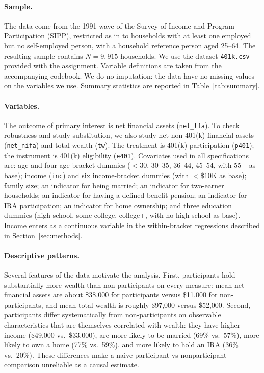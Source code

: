 \documentclass[11pt]{article}
\begin{document}
\paragraph{Sample.}
The data come from the 1991 wave of the Survey of Income and Program
Participation (SIPP), restricted as in \cite{ch2004} to households with at
least one employed but no self-employed person, with a household reference
person aged 25--64.  The resulting sample contains
$N = 9{,}915$ households.  We use the dataset \texttt{401k.csv} provided
with the assignment.  Variable definitions are taken from the accompanying
codebook.  We do no imputation: the data have no missing values on the
variables we use.  Summary statistics are reported in Table~\ref{tab:summary}.

\paragraph{Variables.}
The outcome of primary interest is net financial assets (\texttt{net\_tfa}).
To check robustness and study substitution, we also study net non-401(k)
financial assets (\texttt{net\_nifa}) and total wealth (\texttt{tw}).  The
treatment is 401(k) participation (\texttt{p401}); the instrument is 401(k)
eligibility (\texttt{e401}).  Covariates used in all specifications are: age
and four age-bracket dummies ($<\!30$, 30--35, 36--44, 45--54, with 55+ as
base); income (\texttt{inc}) and six income-bracket dummies (with $<\!\$10$K
as base); family size; an indicator for being married; an indicator for
two-earner households; an indicator for having a defined-benefit pension; an
indicator for IRA participation; an indicator for home ownership; and three
education dummies (high school, some college, college+, with no high school
as base).  Income enters as a continuous variable in the within-bracket
regressions described in Section~\ref{sec:methods}.

\paragraph{Descriptive patterns.}
Several features of the data motivate the analysis.  First, participants
hold substantially more wealth than non-participants on every measure: mean
net financial assets are about \$38{,}000 for participants versus \$11{,}000
for non-participants, and mean total wealth is roughly \$97{,}000 versus
\$52{,}000.  Second, participants differ systematically from non-participants
on observable characteristics that are themselves correlated with wealth:
they have higher income (\$49{,}000 vs.\ \$33{,}000), are more likely to be
married (69\% vs.\ 57\%), more likely to own a home (77\% vs.\ 59\%), and
more likely to hold an IRA (36\% vs.\ 20\%).  These differences make a naive
participant-vs-nonparticipant comparison unreliable as a causal estimate.
\end{document}
